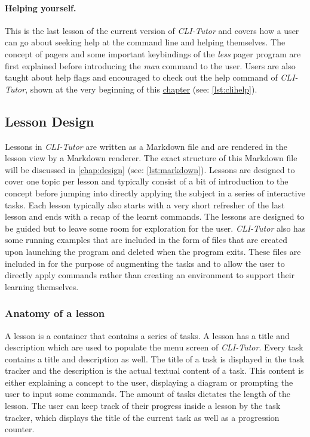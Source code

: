 \paragraph{Helping yourself.} This is the last lesson of the current version of
\textit{CLI-Tutor} and covers how a user can go about seeking help at the
command line and helping themselves. The concept of pagers and some important
keybindings of the \textit{less} pager program are first explained before
introducing the \textit{man} command to the user. Users are also taught about
help flags and encouraged to check out the help command of \textit{CLI-Tutor},
shown at the very beginning of this \hyperref[chap:clitutor]{chapter} (see:
\autoref{lst:clihelp}).

\subsection{Lesson Design}
Lessons in \textit{CLI-Tutor} are written as a Markdown file and are rendered
in the lesson view by a Markdown renderer. The exact structure of this Markdown
file will be discussed in \autoref{chap:design} (see: \autoref{lst:markdown}).
Lessons are designed to cover one topic per lesson and typically consist of a
bit of introduction to the concept before jumping into directly applying the
subject in a series of interactive tasks. Each lesson typically also starts
with a very short refresher of the last lesson and ends with a recap of the
learnt commands. The lessons are designed to be guided but to leave some room
for exploration for the user. \textit{CLI-Tutor} also has some running examples
that are included in the form of files that are created upon launching the
program and deleted when the program exits. These files are included in for the
purpose of augmenting the tasks and to allow the user to directly apply
commands rather than creating an environment to support their learning
themselves.

\subsubsection{Anatomy of a lesson} A lesson is a container that contains a
series of tasks. A lesson has a title and description which are used to
populate the menu screen of \textit{CLI-Tutor}. Every task contains a title and
description as well. The title of a task is displayed in the task tracker and
the description is the actual textual content of a task. This content is either
explaining a concept to the user, displaying a diagram or prompting the user to
input some commands. The amount of tasks dictates the length of the lesson. The
user can keep track of their progress inside a lesson by the task tracker,
which displays the title of the current task as well as a progression counter.

